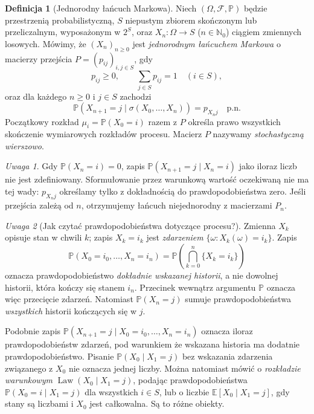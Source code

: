 \documentclass[11pt,a4paper,oneside]{report}
\numberwithin{equation}{chapter}
\theoremstyle{plain}
\theoremstyle{definition}
\newtheorem{definicja}{Definicja}[chapter]
\theoremstyle{remark}
\newtheorem{uwaga}{Uwaga}[chapter]
\newcommand{\N}{\mathbb{N}}
\newcommand{\Prob}{\mathbb{P}}
\newcommand{\E}{\mathbb{E}}
\newcommand{\Law}{\operatorname{Law}}
\begin{document}
\begin{definicja}[Jednorodny łańcuch Markowa]
Niech $(\Omega,\mathcal F,\Prob)$ będzie przestrzenią
probabilistyczną, $S$ niepustym zbiorem skończonym lub
przeliczalnym, wyposażonym w $2^S$, oraz
$X_n:\Omega\to S$ ($n\in\N_0$) ciągiem zmiennych losowych.
Mówimy, że $(X_n)_{n\geq0}$ jest \emph{jednorodnym
łańcuchem Markowa} o macierzy przejścia
$P=(p_{ij})_{i,j\in S}$, gdy
\[
 p_{ij}\geq0,\qquad \sum_{j\in S}p_{ij}=1
 \quad(i\in S),
\]
oraz dla każdego $n\geq0$ i $j\in S$ zachodzi
\[
\Prob(X_{n+1}=j\mid\sigma(X_0,\ldots,X_n))
=p_{X_nj}\quad\text{p.n.}
\]
Początkowy rozkład $\mu_i=\Prob(X_0=i)$
razem z $P$ określa prawo wszystkich skończenie
wymiarowych rozkładów procesu. Macierz $P$ nazywamy
\emph{stochastyczną wierszowo}.
\end{definicja}

\begin{uwaga}
Gdy $\Prob(X_n=i)=0$, zapis
$\Prob(X_{n+1}=j\mid X_n=i)$ jako iloraz liczb
nie jest zdefiniowany. Sformułowanie przez
warunkową wartość oczekiwaną nie ma tej wady:
$p_{X_nj}$ określamy tylko z dokładnością do
prawdopodobieństwa zero. Jeśli przejścia zależą
od $n$, otrzymujemy łańcuch niejednorodny
z macierzami $P_n$.
\end{uwaga}


\begin{uwaga}[Jak czytać prawdopodobieństwa dotyczące procesu?]
Zmienna $X_k$ opisuje stan w chwili $k$; zapis
$X_k=i_k$ jest \emph{zdarzeniem} $\{\omega:X_k(\omega)=i_k\}$.
Zapis
\[
\Prob(X_0=i_0,\ldots,X_n=i_n)
=\Prob\left(\bigcap_{k=0}^n\{X_k=i_k\}\right)
\]
oznacza prawdopodobieństwo \emph{dokładnie wskazanej historii},
a nie dowolnej historii, która kończy się stanem $i_n$.
Przecinek wewnątrz argumentu $\Prob$ oznacza więc
przecięcie zdarzeń. Natomiast
$\Prob(X_n=j)$ sumuje prawdopodobieństwa \emph{wszystkich}
historii kończących się w $j$.

Podobnie zapis
$\Prob(X_{n+1}=j\mid X_0=i_0,\ldots,X_n=i_n)$
oznacza iloraz prawdopodobieństw zdarzeń, pod warunkiem
że wskazana historia ma dodatnie prawdopodobieństwo.
Pisanie $\Prob(X_0\mid X_1=j)$ bez wskazania zdarzenia
związanego z $X_0$ nie oznacza jednej liczby.
Można natomiast mówić o \emph{rozkładzie warunkowym}
$\Law(X_0\mid X_1=j)$, podając prawdopodobieństwa
$\Prob(X_0=i\mid X_1=j)$ dla wszystkich $i\in S$,
lub o liczbie $\E[X_0\mid X_1=j]$, gdy stany są liczbami
i $X_0$ jest całkowalna. Są to różne obiekty.
\end{uwaga}
\end{document}
